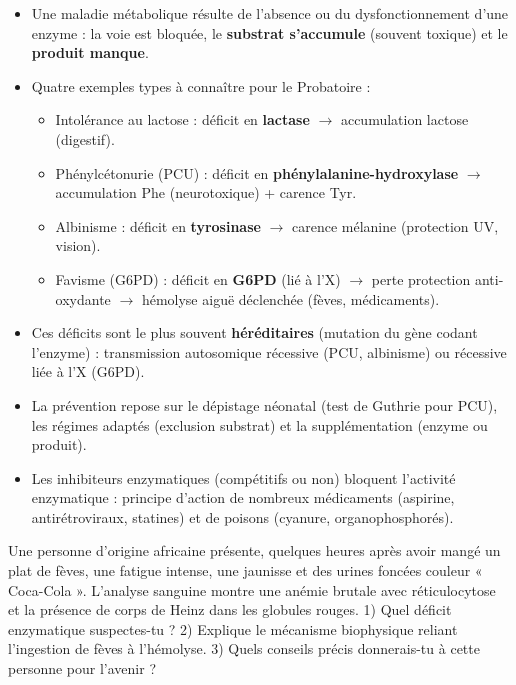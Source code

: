 \documentclass[11pt]{article}
\begin{document}
\begin{aretenir}
\begin{itemize}
\item Une maladie métabolique résulte de l'absence ou du dysfonctionnement d'une enzyme : la voie est bloquée, le \textbf{substrat s'accumule} (souvent toxique) et le \textbf{produit manque}.
\item Quatre exemples types à connaître pour le Probatoire :
  \begin{itemize}
  \item Intolérance au lactose : déficit en \textbf{lactase} $\rightarrow$ accumulation lactose (digestif).
  \item Phénylcétonurie (PCU) : déficit en \textbf{phénylalanine-hydroxylase} $\rightarrow$ accumulation Phe (neurotoxique) + carence Tyr.
  \item Albinisme : déficit en \textbf{tyrosinase} $\rightarrow$ carence mélanine (protection UV, vision).
  \item Favisme (G6PD) : déficit en \textbf{G6PD} (lié à l'X) $\rightarrow$ perte protection anti-oxydante $\rightarrow$ hémolyse aiguë déclenchée (fèves, médicaments).
  \end{itemize}
\item Ces déficits sont le plus souvent \textbf{héréditaires} (mutation du gène codant l'enzyme) : transmission autosomique récessive (PCU, albinisme) ou récessive liée à l'X (G6PD).
\item La prévention repose sur le dépistage néonatal (test de Guthrie pour PCU), les régimes adaptés (exclusion substrat) et la supplémentation (enzyme ou produit).
\item Les inhibiteurs enzymatiques (compétitifs ou non) bloquent l'activité enzymatique : principe d'action de nombreux médicaments (aspirine, antirétroviraux, statines) et de poisons (cyanure, organophosphorés).
\end{itemize}
\end{aretenir}

\begin{exercice}
Une personne d'origine africaine présente, quelques heures après avoir mangé un plat de fèves, une fatigue intense, une jaunisse et des urines foncées couleur « Coca-Cola ». L'analyse sanguine montre une anémie brutale avec réticulocytose et la présence de corps de Heinz dans les globules rouges. 1) Quel déficit enzymatique suspectes-tu ? 2) Explique le mécanisme biophysique reliant l'ingestion de fèves à l'hémolyse. 3) Quels conseils précis donnerais-tu à cette personne pour l'avenir ?
\end{exercice}
\end{document}
